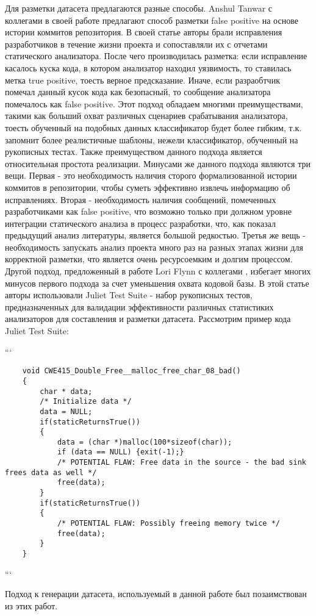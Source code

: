 Для разметки датасета предлагаются разные способы. Anshul Tanwar с коллегами в своей работе \cite{assesing-validity-of-sa-warnings-cisco} предлагают способ разметки false positive на основе истории коммитов репозитория. В своей статье авторы брали исправления разработчиков в течение жизни проекта и сопоставляли их с отчетами статического анализатора. После чего производилась разметка: если исправление касалось куска кода, в котором анализатор находил уязвимость, то ставилась метка true positive, тоесть верное предсказание. Иначе, если разраобтчик помечал данный кусок кода как безопасный, то сообщение анализатора помечалось как false positive. Этот подход обладаем многими преимуществами, такими как больший охват различных сценариев срабатывания анализатора, тоесть обученный на подобных данных классификатор будет более гибким, т.к. запомнит более реалистичные шаблоны, нежели классификатор, обученный на рукописных тестах. Также преимуществом данного подхода является относительная простота реализации. Минусами же данного подхода являются три вещи. Первая - это необходимость наличия сторого формализованной истории коммитов в репозитории, чтобы суметь эффективно извлечь информацию об исправлениях. Вторая - необходимость наличия сообщений, помеченных разработчиками как false positive, что возможно только при должном уровне интеграции статического анализа в процесс разработки, что, как показал предыдущий анализ литературы, является большой редкостью. Третья же вещь - необходимость запускать анализ проекта много раз на разных этапах жизни для корректной разметки, что является очень ресурсоемким и долгим процессом. Другой подход, предложенный в работе Lori Flynn с коллегами \cite{test-suites-for-dataset}, избегает многих минусов первого подхода за счет уменьшения охвата кодовой базы. В этой статье авторы использовали Juliet Test Suite - набор рукописных тестов, предназначенных для валидации эффективности различных статистиких анализаторов\cite{Juliet} для составления и разметки датасета. Рассмотрим пример кода Juliet Test Suite:

```
\begin{verbatim}
    void CWE415_Double_Free__malloc_free_char_08_bad()
    {
        char * data;
        /* Initialize data */
        data = NULL;
        if(staticReturnsTrue())
        {
            data = (char *)malloc(100*sizeof(char));
            if (data == NULL) {exit(-1);}
            /* POTENTIAL FLAW: Free data in the source - the bad sink frees data as well */
            free(data);
        }
        if(staticReturnsTrue())
        {
            /* POTENTIAL FLAW: Possibly freeing memory twice */
            free(data);
        }
    }
\end{verbatim}
```


Подход к генерации датасета, используемый в данной работе был позаимствован из этих работ.

\newpage